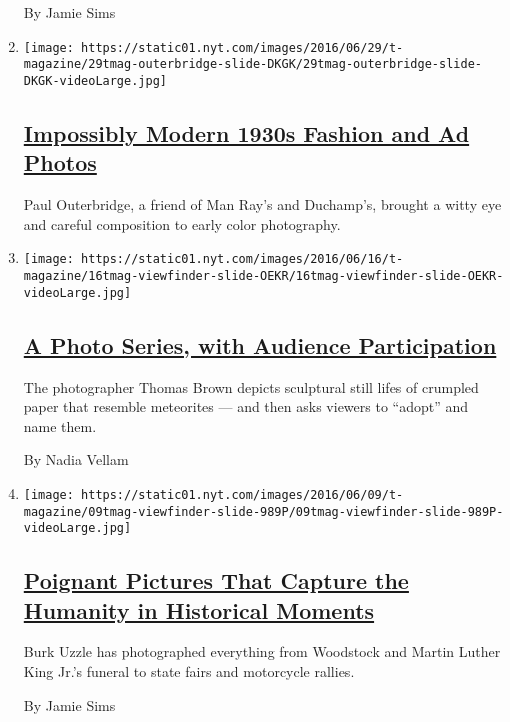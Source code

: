 \begin{enumerate}
  By Jamie Sims
\item
  \texttt{[image: https://static01.nyt.com/images/2016/06/29/t-magazine/29tmag-outerbridge-slide-DKGK/29tmag-outerbridge-slide-DKGK-videoLarge.jpg]}

  \hypertarget{impossibly-modern-1930s-fashion-and-ad-photos}{%
  \subsection{\texorpdfstring{\href{/slideshow/2016/06/29/t-magazine/fashion/1930s-fashion-ad-photos.html}{Impossibly
  Modern 1930s Fashion and Ad
  Photos}}{Impossibly Modern 1930s Fashion and Ad Photos}}\label{impossibly-modern-1930s-fashion-and-ad-photos}}

  Paul Outerbridge, a friend of Man Ray's and Duchamp's, brought a witty
  eye and careful composition to early color photography.
\item
  \texttt{[image: https://static01.nyt.com/images/2016/06/16/t-magazine/16tmag-viewfinder-slide-OEKR/16tmag-viewfinder-slide-OEKR-videoLarge.jpg]}

  \hypertarget{a-photo-series-with-audience-participation}{%
  \subsection{\texorpdfstring{\href{/slideshow/2016/06/16/t-magazine/paper-meteorites-photos.html}{A
  Photo Series, with Audience
  Participation}}{A Photo Series, with Audience Participation}}\label{a-photo-series-with-audience-participation}}

  The photographer Thomas Brown depicts sculptural still lifes of
  crumpled paper that resemble meteorites --- and then asks viewers to
  ``adopt'' and name them.

  By Nadia Vellam
\item
  \texttt{[image: https://static01.nyt.com/images/2016/06/09/t-magazine/09tmag-viewfinder-slide-989P/09tmag-viewfinder-slide-989P-videoLarge.jpg]}

  \hypertarget{poignant-pictures-that-capture-the-humanity-in-historical-moments}{%
  \subsection{\texorpdfstring{\href{/slideshow/2016/06/09/t-magazine/burk-uzzle-photographs.html}{Poignant
  Pictures That Capture the Humanity in Historical
  Moments}}{Poignant Pictures That Capture the Humanity in Historical Moments}}\label{poignant-pictures-that-capture-the-humanity-in-historical-moments}}

  Burk Uzzle has photographed everything from Woodstock and Martin
  Luther King Jr.'s funeral to state fairs and motorcycle rallies.

  By Jamie Sims
\end{enumerate}

